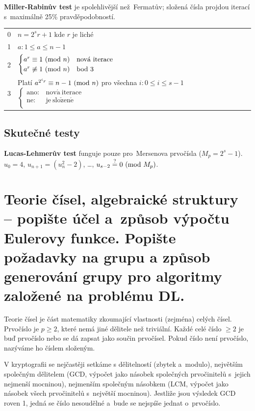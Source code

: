 \noindent \textbf{Miller-Rabinův test} je spolehlivější než~Fermatův; složená čísla projdou iterací s~maximálně 25\% pravděpodobností.

\begin{table}[ht]
\begin{tabular}{l|l}
0 & $n = 2^s r + 1$ kde $r$ je liché \\
1 & $a: 1 \leq a \leq n-1$ \\
2 & $\begin{cases}
a^r \equiv 1 \ (\mathrm{mod}\ n) & \mathrm{nov\acute{a}\ iterace} \\
a^r \not\equiv 1 \ (\mathrm{mod}\ n) & \mathrm{bod\ 3} \\
\end{cases}$ \\
3 & Platí $a^{2^i r} \equiv n-1 \ (\mathrm{mod}\ n)$ pro všechna $i: 0 \leq i \leq s-1$ $\begin{cases}
\mathrm{ano:} & \mathrm{nov\acute{a}\ iterace} \\
\mathrm{ne:} & \mathrm{je\ slo\check{z}en\acute{e}} \\
\end{cases}$ \\
\end{tabular}
\end{table}

\subsection{Skutečné testy}

\textbf{Lucas-Lehmerův test} funguje pouze pro~Mersenova prvočísla ($M_p = 2^s - 1$). \\
$u_0 = 4$, $u_{n+1} = (u_n^2 - 2)$, \dots, $u_{s-2} \stackrel{?}{=} 0 \ (\mathrm{mod}\ M_p)$.

\clearpage
\section{Teorie čísel, algebraické struktury -- popište účel a~způsob výpočtu Eulerovy funkce. Popište požadavky na grupu a způsob generování grupy pro algoritmy založené na problému DL.}

Teorie čísel je část matematiky zkoumající vlastnosti (zejména) celých čísel. Prvočíslo je $p \geq 2$, které nemá jiné dělitele než triviální. Každé celé číslo $\geq 2$ je buď prvočíslo nebo se dá zapsat jako součin prvočísel. Pokud číslo není prvočíslo, nazýváme ho číslem složeným.

V kryptografii se nejčastěji setkáme s dělitelností (zbytek a~modulo), největším společným dělitelem (GCD, výpočet jako násobek společných prvočinitelů s~jejich nejmenší mocninou), nejmenším společným násobkem (LCM, výpočet jako násobek všech prvočinitelů s~největší mocninou). Jestliže jsou výsledek GCD roven 1, jedná se číslo nesoudělné a~bude se nejspíše jednat o~prvočíslo.

